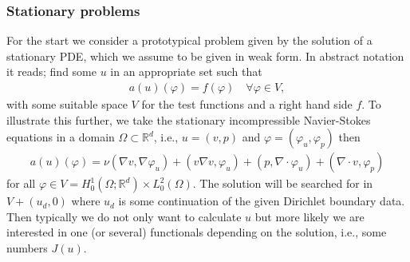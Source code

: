 \documentclass[prodmode,acmtoms]{acmsmall}
\numberwithin{equation}{section}
\newcommand{\R}{\mathbb{R}}
\renewcommand{\phi}{\varphi}
\begin{document}
\subsubsection{Stationary problems}\label{subsubsec:stationary problems}
For the start we consider a prototypical problem given by the solution of 
a stationary PDE, which we assume to be given in weak form.
In abstract notation it reads; find some $u$ in an appropriate set
such that
\begin{align}\label{eq:prototype_weak}
a(u)(\phi) = f(\phi) \quad \forall \phi \in V,
\end{align}
with some suitable space $V$ for the test functions and a 
right hand side $f$.
To illustrate this further, we take the stationary 
incompressible Navier-Stokes equations in a domain $\Omega \subset \R^d$, 
i.e., $u = (v,p)$ and $\phi = (\phi_u,\phi_p)$ then
\begin{align}\label{eq:ns}
a(u)(\phi) = \nu(\nabla v, \nabla\phi_u) + (v \nabla v,\phi_u) + (p, \nabla \cdot \phi_u) + (\nabla \cdot v ,\phi_p)
\end{align}
for all $\phi \in V = H^1_0(\Omega;\R^d) \times L^2_0(\Omega)$.
The solution will be searched for in $V + (u_d,0)$ where $u_d$ is some 
continuation of the given Dirichlet boundary data.
Then typically we do not only want to calculate $u$ but more likely we are 
interested in one (or several) functionals depending on the solution, i.e., some numbers $J(u)$.
\end{document}
